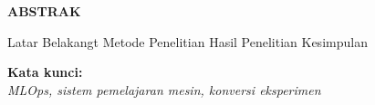 \clearpage
{}
\begin{center}
  \textbf{\large \MakeUppercase{Abstrak}}\\[3em]
\end{center}

Latar Belakangt
Metode Penelitian
Hasil Penelitian
Kesimpulan


\noindent \textbf{Kata kunci:}\\
\emph{MLOps, sistem pemelajaran mesin, konversi eksperimen}
